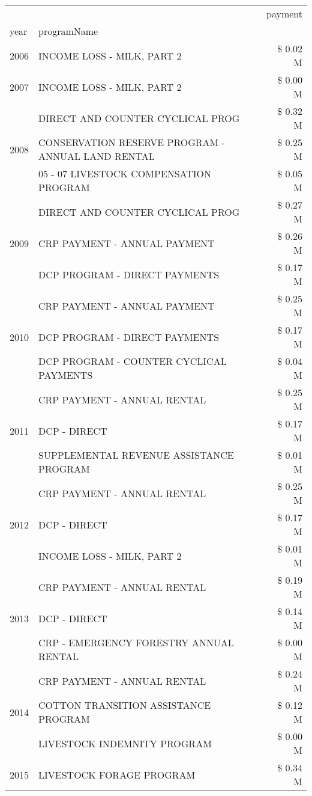 \begin{tabular}{llr}
\toprule
 &  & payment \\
year & programName &  \\
\midrule
2006 & INCOME LOSS - MILK, PART 2 & \$ 0.02 M \\
\cline{1-3}
2007 & INCOME LOSS - MILK, PART 2 & \$ 0.00 M \\
\cline{1-3}
\multirow[t]{3}{*}{2008} & DIRECT AND COUNTER CYCLICAL PROG & \$ 0.32 M \\
 & CONSERVATION RESERVE PROGRAM - ANNUAL LAND RENTAL & \$ 0.25 M \\
 & 05 - 07 LIVESTOCK COMPENSATION PROGRAM & \$ 0.05 M \\
\cline{1-3}
\multirow[t]{3}{*}{2009} & DIRECT AND COUNTER CYCLICAL PROG & \$ 0.27 M \\
 & CRP PAYMENT - ANNUAL PAYMENT & \$ 0.26 M \\
 & DCP PROGRAM - DIRECT PAYMENTS & \$ 0.17 M \\
\cline{1-3}
\multirow[t]{3}{*}{2010} & CRP PAYMENT - ANNUAL PAYMENT & \$ 0.25 M \\
 & DCP PROGRAM - DIRECT PAYMENTS & \$ 0.17 M \\
 & DCP PROGRAM - COUNTER CYCLICAL PAYMENTS & \$ 0.04 M \\
\cline{1-3}
\multirow[t]{3}{*}{2011} & CRP PAYMENT - ANNUAL RENTAL & \$ 0.25 M \\
 & DCP - DIRECT & \$ 0.17 M \\
 & SUPPLEMENTAL REVENUE ASSISTANCE PROGRAM & \$ 0.01 M \\
\cline{1-3}
\multirow[t]{3}{*}{2012} & CRP PAYMENT - ANNUAL RENTAL & \$ 0.25 M \\
 & DCP - DIRECT & \$ 0.17 M \\
 & INCOME LOSS - MILK, PART 2 & \$ 0.01 M \\
\cline{1-3}
\multirow[t]{3}{*}{2013} & CRP PAYMENT - ANNUAL RENTAL & \$ 0.19 M \\
 & DCP - DIRECT & \$ 0.14 M \\
 & CRP - EMERGENCY FORESTRY ANNUAL RENTAL & \$ 0.00 M \\
\cline{1-3}
\multirow[t]{3}{*}{2014} & CRP PAYMENT - ANNUAL RENTAL & \$ 0.24 M \\
 & COTTON TRANSITION ASSISTANCE PROGRAM & \$ 0.12 M \\
 & LIVESTOCK INDEMNITY PROGRAM & \$ 0.00 M \\
\cline{1-3}
\multirow[t]{3}{*}{2015} & LIVESTOCK FORAGE PROGRAM & \$ 0.34 M \\

\end{tabular}
